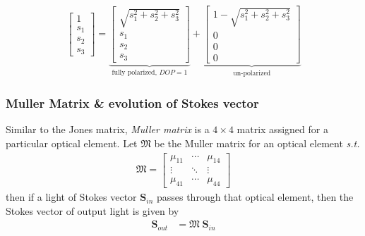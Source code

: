 \documentclass[11pt,a4paper]{article}
\numberwithin{equation}{section}
\begin{document}
\begin{align}
	\begin{bmatrix} 1\\ s_1\\ s_2\\ s_3\end{bmatrix} = 
	\underbrace{\begin{bmatrix} \sqrt{s_1^2+s_2^2+s_3^2}\\ s_1\\ s_2\\ s_3\end{bmatrix}}_{\text{fully polarized, } DOP = 1} +
	\underbrace{\begin{bmatrix} 1-\sqrt{s_1^2+s_2^2+s_3^2}\\0\\ 0\\ 0\end{bmatrix}}_{\text{un-polarized}}
\end{align}

\subsubsection{Muller Matrix \& evolution of Stokes vector}
Similar to the Jones matrix, \textit{Muller matrix} is a $4\times4$ matrix assigned for a particular optical element. Let $\boldsymbol{\mathfrak{M}}$ be the Muller matrix for an optical element \textit{s.t.} 
\begin{align*}\boldsymbol{\mathfrak{M}}=
	\begin{bmatrix}
		\mu_{11} & \cdots & \mu_{14}\\
		\vdots & \ddots & \vdots\\
		\mu_{41} & \cdots & \mu_{44}
	\end{bmatrix}
\end{align*}
then if a light of Stokes vector $\boldsymbol{S}_{in}$ passes through that optical element, then the Stokes vector of output light is given by 
\begin{align}
	\boldsymbol{S}_{out}&=\boldsymbol{\mathfrak{M}}\;\boldsymbol{S}_{in}\label{eq:1.33}
\end{align}
\end{document}
